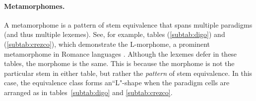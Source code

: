 \paragraph{Metamorphomes.} A metamorphome is a pattern of stem 
equivalence that spans multiple paradigms 
(and thus multiple lexemes). See, for example, tables (\ref{subtab:digo}) 
and (\ref{subtab:crezco}), which demonstrate the L-morphome, a prominent 
metamorphome in Romance languages \citep{maiden:2005}. Although the 
lexemes defer in these tables, the morphome is the same. This is because 
the morphome is not the particular stem in either table, but rather the 
\emph{pattern} of stem equivalence. In this case, the equivalence class 
forms  an``L"-shape when the paradigm cells are arranged as in tables~\ref{subtab:digo} and \ref{subtab:crezco}.
\begin{table}[ht]
\centering %
\vspace{7pt}
\label{tab:l-morphome}
\caption{The stem \textit{crezc-} `say' is an L-morphome in Spanish.}
\end{table}
